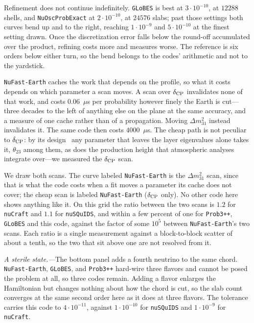 \documentclass[final,5p,times,twocolumn,sort,compress]{elsarticle}
\begin{document}
Refinement does not continue indefinitely.  {\tt GLoBES} is best at $3 \cdot 10^{-10}$, at $12288$ shells, and {\tt NuOscProbExact} at $2 \cdot 10^{-10}$, at $24576$ slabs; past those settings both curves bend up and to the right, reaching $1 \cdot 10^{-9}$ and $5 \cdot 10^{-10}$ at the finest setting drawn.  Once the discretization error falls below the round-off accumulated over the product, refining costs more and measures worse.  The reference is six orders below either turn, so the bend belongs to the codes' arithmetic and not to the yardstick.

{\tt NuFast-Earth} caches the work that depends on the profile, so what it costs depends on which parameter a scan moves.  A scan over $\delta_{\rm CP}$ invalidates none of that work, and costs $0.06$~$\mu$s per probability however finely the Earth is cut---three decades to the left of anything else on the plane at the same accuracy, and a measure of one cache rather than of a propagation.  Moving $\Delta m^2_{31}$ instead invalidates it.  The same code then costs $4000$~$\mu$s.  The cheap path is not peculiar to $\delta_{\rm CP}$: by its design\ \cite{Denton:2025oxf} any parameter that leaves the layer eigenvalues alone takes it, $\theta_{23}$ among them, as does the production height that atmospheric analyses integrate over---we measured the $\delta_{\rm CP}$ scan.

We draw both scans.  The curve labeled {\tt NuFast-Earth} is the $\Delta m^2_{31}$ scan, since that is what the code costs when a fit moves a parameter its cache does not cover; the cheap scan is labeled {\tt NuFast-Earth} ($\delta_{\rm CP}$ only).  No other code here shows anything like it.  On this grid the ratio between the two scans is $1.2$ for {\tt nuCraft} and $1.1$ for {\tt nuSQuIDS}, and within a few percent of one for {\tt Prob3++}, {\tt GLoBES} and this code, against the factor of some $10^5$ between {\tt NuFast-Earth}'s two scans.  Each ratio is a single measurement against a block-to-block scatter of about a tenth, so the two that sit above one are not resolved from it.

\smallskip

\textit{A sterile state.---}The bottom panel adds a fourth neutrino to the same chord.  {\tt NuFast-Earth}, {\tt GLoBES}, and {\tt Prob3++} hard-wire three flavors and cannot be posed the problem at all, so three codes remain.  Adding a flavor enlarges the Hamiltonian but changes nothing about how the chord is cut, so the slab count converges at the same second order here as it does at three flavors.  The tolerance carries this code to $4 \cdot 10^{-11}$, against $1 \cdot 10^{-10}$ for {\tt nuSQuIDS} and $1 \cdot 10^{-9}$ for {\tt nuCraft}.
\end{document}
